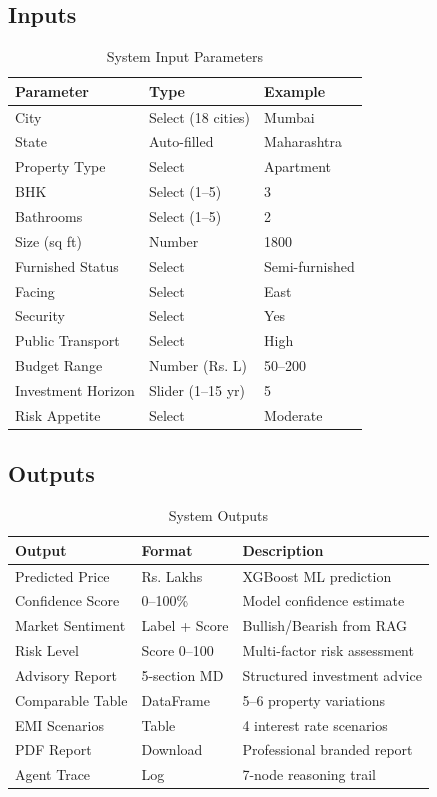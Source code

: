 \documentclass[12pt,a4paper]{article}
\begin{document}
\subsection{Inputs}
\begin{table}[H]\centering
\caption{System Input Parameters}
\begin{tabular}{@{}llp{5cm}@{}}
\toprule
\textbf{Parameter} & \textbf{Type} & \textbf{Example} \\
\midrule
City & Select (18 cities) & Mumbai \\
State & Auto-filled & Maharashtra \\
Property Type & Select & Apartment \\
BHK & Select (1--5) & 3 \\
Bathrooms & Select (1--5) & 2 \\
Size (sq ft) & Number & 1800 \\
Furnished Status & Select & Semi-furnished \\
Facing & Select & East \\
Security & Select & Yes \\
Public Transport & Select & High \\
Budget Range & Number (Rs. L) & 50--200 \\
Investment Horizon & Slider (1--15 yr) & 5 \\
Risk Appetite & Select & Moderate \\
\bottomrule
\end{tabular}
\end{table}

\subsection{Outputs}
\begin{table}[H]\centering
\caption{System Outputs}
\begin{tabular}{@{}llp{6cm}@{}}
\toprule
\textbf{Output} & \textbf{Format} & \textbf{Description} \\
\midrule
Predicted Price & Rs. Lakhs & XGBoost ML prediction \\
Confidence Score & 0--100\% & Model confidence estimate \\
Market Sentiment & Label + Score & Bullish/Bearish from RAG \\
Risk Level & Score 0--100 & Multi-factor risk assessment \\
Advisory Report & 5-section MD & Structured investment advice \\
Comparable Table & DataFrame & 5--6 property variations \\
EMI Scenarios & Table & 4 interest rate scenarios \\
PDF Report & Download & Professional branded report \\
Agent Trace & Log & 7-node reasoning trail \\
\bottomrule
\end{tabular}
\end{table}
\end{document}

